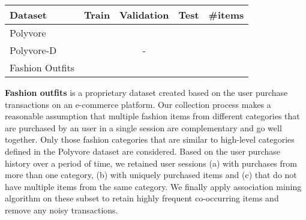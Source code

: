 \documentclass[sigconf]{acmart}
\begin{document}
\begin{comment}
\begin{table}[t]
    \centering
    \caption{Statistics of Polyvore, Polyvore-D and newly created fashion dataset in terms of number of outfits in train, validation and test splits. We also mention overall fashion items in these datasets. Our dataset has 10 times more outfits than existing datasets.}
    \vspace{1.5mm}
    \setlength{\tabcolsep}{5pt}
\begin{tabular}{l|cccc}
    \hline
        Dataset & Train & Validation & Test & \#items \\
        \hline
        Polyvore &  &  &  &  \\
        Polyvore-D &  & - &  &  \\
        Fashion Outfits &  &  &  &  \\
        \hline
    \end{tabular}
\vspace{-3mm}
    \label{table:datasets}
\end{table}
\end{comment}

\begin{table}

\vspace{1.5mm}
\begin{tabular}{l|cccc}
    \hline
        Dataset & Train & Validation & Test & \#items \\
        \hline
        Polyvore &  &  &  &  \\
        Polyvore-D &  & - &  &  \\
        Fashion Outfits &  &  &  &  \\
        \hline
    \end{tabular}
    
    \label{table:datasets}
\end{table}

\vspace{2mm}
\noindent \textbf{Fashion outfits} is a proprietary dataset created based on the user purchase transactions on an e-commerce platform. Our collection process makes a reasonable assumption that multiple fashion items from different categories that are purchased by an user in a single session are complementary and go well together. Only those fashion categories that are similar to high-level categories defined in the Polyvore dataset are considered. Based on the user purchase history over a period of time, we retained user sessions (a) with purchases from more than one category, (b) with uniquely purchased items and (c) that do not have multiple items from the same category. We finally apply association mining algorithm \cite{apriori} on these subset to retain highly frequent co-occurring items and remove any noisy transactions.
\end{document}

